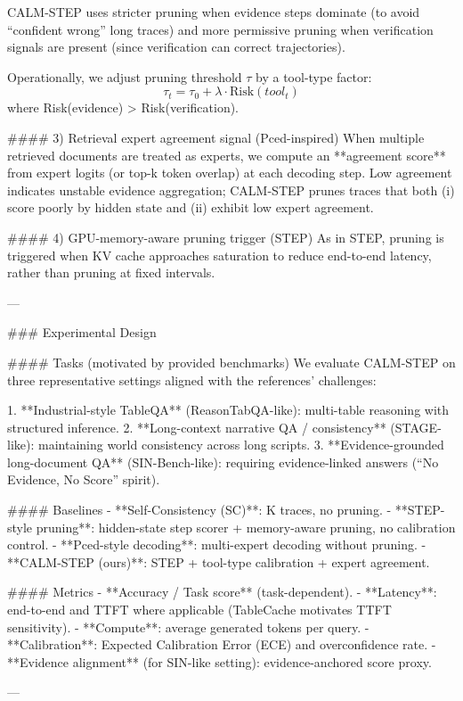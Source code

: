 CALM-STEP uses stricter pruning when evidence steps dominate (to avoid “confident wrong” long traces) and more permissive pruning when verification signals are present (since verification can correct trajectories).

Operationally, we adjust pruning threshold \(\tau\) by a tool-type factor:
\[
\tau_t = \tau_0 + \lambda \cdot \text{Risk}(tool_t)
\]
where Risk(evidence) > Risk(verification).

#### 3) Retrieval expert agreement signal (Pced-inspired)  
When multiple retrieved documents are treated as experts, we compute an **agreement score** from expert logits (or top-k token overlap) at each decoding step. Low agreement indicates unstable evidence aggregation; CALM-STEP prunes traces that both (i) score poorly by hidden state and (ii) exhibit low expert agreement.

#### 4) GPU-memory-aware pruning trigger (STEP)  
As in STEP, pruning is triggered when KV cache approaches saturation to reduce end-to-end latency, rather than pruning at fixed intervals.

---

### Experimental Design  

#### Tasks (motivated by provided benchmarks)  
We evaluate CALM-STEP on three representative settings aligned with the references’ challenges:

1. **Industrial-style TableQA** (ReasonTabQA-like): multi-table reasoning with structured inference.  
2. **Long-context narrative QA / consistency** (STAGE-like): maintaining world consistency across long scripts.  
3. **Evidence-grounded long-document QA** (SIN-Bench-like): requiring evidence-linked answers (“No Evidence, No Score” spirit).

#### Baselines  
- **Self-Consistency (SC)**: K traces, no pruning.  
- **STEP-style pruning**: hidden-state step scorer + memory-aware pruning, no calibration control.  
- **Pced-style decoding**: multi-expert decoding without pruning.  
- **CALM-STEP (ours)**: STEP + tool-type calibration + expert agreement.

#### Metrics  
- **Accuracy / Task score** (task-dependent).  
- **Latency**: end-to-end and TTFT where applicable (TableCache motivates TTFT sensitivity).  
- **Compute**: average generated tokens per query.  
- **Calibration**: Expected Calibration Error (ECE) and overconfidence rate.  
- **Evidence alignment** (for SIN-like setting): evidence-anchored score proxy.

---

